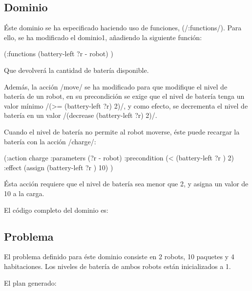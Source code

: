 \documentclass[	DIV=calc,%
							paper=a4,%
							fontsize=11pt]{scrartcl}	 					%
\newcommand{\lispscript}[2]{
    \myLisp[label=#2]{#1}
}
\begin{document}
\subsection{Dominio}
\label{sub:Dominio}

Éste dominio se ha especificado haciendo uso de funciones, (\newlispinline/:functions/). Para ello, se ha modificado el dominio1, añadiendo la siguiente función:

\begin{newlispcode}
	(:functions
		(battery-left ?r - robot)
	)
\end{newlispcode}

Que devolverá la cantidad de batería disponible.

Además, la acción \newlispinline/move/ se ha modificado para que modifique el nivel de batería de un robot, en su precondición se exige que el nivel de batería tenga un valor mínimo \newlispinline/(>= (battery-left ?r) 2)/, y como efecto, se decrementa el nivel de batería en un valor \newlispinline/(decrease (battery-left ?r) 2)/.

Cuando el nivel de batería no permite al robot moverse, éste puede recargar la batería con la acción \newlispinline/charge/:

\begin{newlispcode}
  (:action charge
    :parameters (?r - robot)
    :precondition (< (battery-left ?r ) 2)
    :effect (assign (battery-left ?r ) 10)
  )
\end{newlispcode}

Ésta acción requiere que el nivel de batería sea menor que 2, y asigna un valor de 10 a la carga.

El código completo del dominio es:

\lispscript{../d2.pddl}{Dominio2.pddl}

\subsection{Problema}
\label{sub:Problema}

El problema definido para éste dominio consiste en 2 robots, 10 paquetes y 4 habitaciones. Los niveles de batería de ambos robots están inicializados a 1.

\lispscript{../p1e2.pddl}{p1e2.pddl}

El plan generado:
\end{document}
